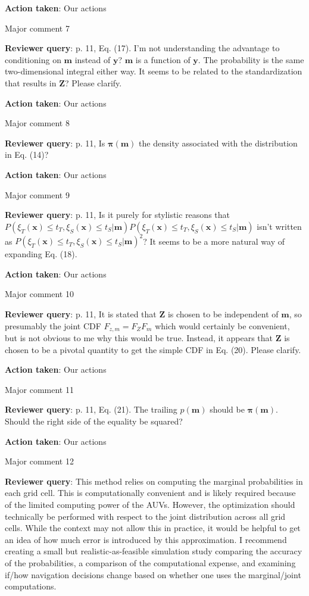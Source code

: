 \documentclass[a4paper]{article}
\newcommand{\bm}{ {\boldsymbol m} }
\newcommand{\bx}{ {\boldsymbol x} }
\newcommand{\by}{ {\boldsymbol y} }
\newcommand{\bZ}{ {\boldsymbol Z} }
\newcommand{\bpi}{ {\boldsymbol \pi} }
\def\reply{\textbf{Reviewer query}}
\def\action{\textbf{Action taken}}
\begin{document}
\begin{answers}
\action: Our actions

\item{Major comment 7}\label{q18}

\reply: p. 11, Eq. (17). I’m not understanding the advantage to conditioning on $\bm$ instead of $\by$? $\bm$ is a function of $\by$. The probability is the same two-dimensional integral either way. It seems to be related to the standardization that results in $\bZ$? Please clarify.

\action: Our actions

\item{Major comment 8}\label{q19}

\reply: p. 11, Is $\bpi(\bm)$ the density associated with the distribution in Eq. (14)? 

\action: Our actions

\item{Major comment 9}\label{q20}

\reply: p. 11, Is it purely for stylistic reasons that $P(\xi_T(\bx) \leq t_T, \xi_S(\bx) \leq t_S |\bm)P(\xi_T(\bx) \leq t_T, \xi_S(\bx) \leq t_S |\bm)$ isn’t written as $P(\xi_T(\bx) \leq t_T, \xi_S(\bx) \leq t_S |\bm)^2$? It seems to be a more natural way of expanding Eq. (18). 

\action: Our actions

\item{Major comment 10}\label{q21}

\reply: p. 11, It is stated that $\bZ$ is chosen to be independent of $\bm$, so presumably the joint CDF $F_{z,m}=F_{Z}F_m$ which would certainly be convenient, but is not obvious to me why this would be true. 
Instead, it appears that $\bZ$ is chosen to be a pivotal quantity to get the simple CDF in Eq. (20). Please clarify.

\action: Our actions

\item{Major comment 11}\label{q22}

\reply: p. 11, Eq. (21). The trailing $p(\bm)$ should be $\bpi(\bm)$. Should the right side of the equality be squared? 

\action: Our actions

\item{Major comment 12}\label{q23}

\reply: This method relies on computing the marginal probabilities in each grid cell. This is computationally convenient and is likely required because of the limited computing power of the AUVs. However, the optimization should technically be performed with respect to the joint distribution across all grid cells. While the context may not allow this in practice, it would be helpful to get an idea of how much error is introduced by this approximation. I recommend creating a small but realistic-as-feasible simulation study comparing the accuracy of the probabilities, a comparison of the computational expense, and examining if/how navigation decisions change based on whether one uses the marginal/joint computations. 


\end{answers}
\end{document}
